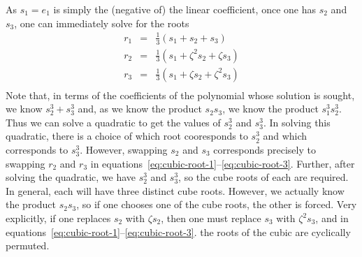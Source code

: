 \documentclass{article}
\begin{document}
As $s_1 = e_1$ is simply the (negative of) the linear coefficient,
once one has $s_2$ and $s_3$, one can immediately solve for the
roots 
\begin{eqnarray}
  r_1 & = & \frac{1}{3} \left( s_1 + s_2 + s_3 \right) 
                 \label{eq:cubic-root-1} \\
  r_2 & = & \frac{1}{3} \left( s_1 + \zeta^2 s_2 + \zeta s_3 \right) 
                 \label{eq:cubic-root-2}  \\
  r_3 & = & \frac{1}{3} \left( s_1 + \zeta s_2 + \zeta^2 s_3 \right) 
                 \label{eq:cubic-root-3}\\
\end{eqnarray}
Note that, in terms of the coefficients of the polynomial whose
solution is sought, we know $s_2^3 + s_3^3$ and,
as we know the product $s_2 s_3$, we know the product $s_1^3 s_2^3$.
Thus we can solve a quadratic to get the values of
$s_2^3$ and $s_3^3$.  In solving this quadratic, there is a
choice of which root cooresponds to $s_2^3$ and which corresponds
to $s_3^3$.  However, swapping $s_2$ and $s_3$ corresponds precisely
to swapping $r_2$ and $r_3$ in 
equations~\ref{eq:cubic-root-1}--\ref{eq:cubic-root-3}.
Further, after solving the quadratic, we have $s_2^3$ and
$s_3^3$, so the cube roots of each are required.  In general,
each will have three distinct cube roots.  However, we actually
know the product $s_2 s_3$, so if one chooses one of the cube
roots, the other is forced.  Very explicitly, if
one replaces $s_2$ with $\zeta s_2$, then one must replace
$s_3$ with $\zeta^2 s_3$, and in 
equations~\ref{eq:cubic-root-1}--\ref{eq:cubic-root-3}.
the roots of the cubic are cyclically permuted.
\end{document}
